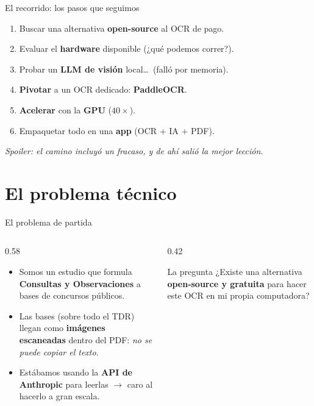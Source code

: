 \documentclass[10pt,aspectratio=169]{beamer}
\begin{document}
\begin{frame}{El recorrido: los pasos que seguimos}
  \begin{enumerate}
    \item Buscar una alternativa \textbf{open-source} al OCR de pago.
    \item Evaluar el \textbf{hardware} disponible (¿qué podemos correr?).
    \item Probar un \textbf{LLM de visión} local\ldots\ \textcolor{mal}{(falló por memoria)}.
    \item \textbf{Pivotar} a un OCR dedicado: \textbf{PaddleOCR}.
    \item \textbf{Acelerar} con la \textbf{GPU} ($40\times$).
    \item Empaquetar todo en una \textbf{app} (OCR + IA + PDF).
  \end{enumerate}
  \vfill
  \centering\footnotesize\emph{Spoiler: el camino incluyó un fracaso, y de ahí salió la mejor lección.}
\end{frame}

\section{El problema técnico}

\begin{frame}{El problema de partida}
  \begin{columns}
    \begin{column}{0.58\textwidth}
      \begin{itemize}
        \item Somos un estudio que formula \textbf{Consultas y Observaciones} a bases de concursos públicos.
        \item Las bases (sobre todo el TDR) llegan como \textbf{imágenes escaneadas} dentro del PDF: \emph{no se puede copiar el texto}.
        \item Estábamos usando la \textbf{API de Anthropic} para leerlas $\rightarrow$ \textcolor{mal}{caro} al hacerlo a gran escala.
      \end{itemize}
    \end{column}
    \begin{column}{0.42\textwidth}
      \begin{block}{La pregunta}
        ¿Existe una alternativa \textbf{open-source y gratuita} para hacer este OCR en mi propia computadora?
      \end{block}
    \end{column}
  \end{columns}
\end{frame}
\end{document}
